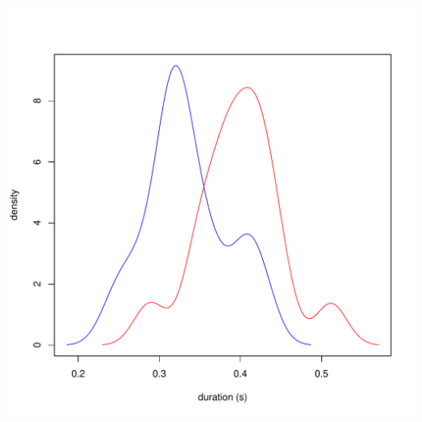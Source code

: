 \documentclass[a4paper,11pt]{article}\usepackage[]{graphicx}\usepackage[]{color}
\makeatletter
\def\maxwidth{ %
  \ifdim\Gin@nat@width>\linewidth
    \linewidth
  \else
    \Gin@nat@width
  \fi
}
\newenvironment{knitrout}{}{} %
\makeatother
\begin{document}
\begin{knitrout}
{\centering \includegraphics[width=\maxwidth]{img/bi-rho-dens-1} 

}



\end{knitrout}
\end{document}
